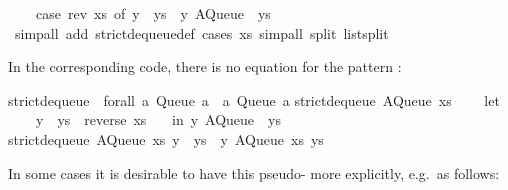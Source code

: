 \begin{isabellebody}
\ \ \ \ {\isacharparenleft}case\ rev\ xs\ of\ y\ {\isacharhash}\ ys\ {\isasymRightarrow}\ {\isacharparenleft}y{\isacharcomma}\ AQueue\ {\isacharbrackleft}{\isacharbrackright}\ ys{\isacharparenright}{\isacharparenright}{\isachardoublequoteclose}\isanewline
\ \ \isamarkupfalse%
\ {\isacharparenleft}simp{\isacharunderscore}all\ add{\isacharcolon}\ strict{\isacharunderscore}dequeue{\isacharunderscore}def{\isacharparenright}\ {\isacharparenleft}cases\ xs{\isacharcomma}\ simp{\isacharunderscore}all\ split{\isacharcolon}\ list{\isachardot}split{\isacharparenright}%
\endisatagquote
{\isafoldquote}%
%
\isadelimquote
%
\endisadelimquote
%
\begin{isamarkuptext}%
\noindent In the corresponding code, there is no equation
  for the pattern :%
\end{isamarkuptext}%
\isamarkuptrue%
%
\isadelimquote
%
\endisadelimquote
%
\isatagquote
%
\begin{isamarkuptext}%
\begin{typewriter}
    strict{\isacharunderscore}dequeue\ {\isacharcolon}{\isacharcolon}\ forall\ a{\isachardot}\ Queue\ a\ {\isacharminus}{\isachargreater}\ {\isacharparenleft}a{\isacharcomma}\ Queue\ a{\isacharparenright}{\isacharsemicolon}\isanewline
strict{\isacharunderscore}dequeue\ {\isacharparenleft}AQueue\ xs\ {\isacharbrackleft}{\isacharbrackright}{\isacharparenright}\ {\isacharequal}\isanewline
\ \ let\ {\isacharbraceleft}\isanewline
\ \ \ \ {\isacharparenleft}y\ {\isacharcolon}\ ys{\isacharparenright}\ {\isacharequal}\ reverse\ xs{\isacharsemicolon}\isanewline
\ \ {\isacharbraceright}\ in\ {\isacharparenleft}y{\isacharcomma}\ AQueue\ {\isacharbrackleft}{\isacharbrackright}\ ys{\isacharparenright}{\isacharsemicolon}\isanewline
strict{\isacharunderscore}dequeue\ {\isacharparenleft}AQueue\ xs\ {\isacharparenleft}y\ {\isacharcolon}\ ys{\isacharparenright}{\isacharparenright}\ {\isacharequal}\ {\isacharparenleft}y{\isacharcomma}\ AQueue\ xs\ ys{\isacharparenright}{\isacharsemicolon}
  \end{typewriter}%
\end{isamarkuptext}%
\isamarkuptrue%
%
\endisatagquote
{\isafoldquote}%
%
\isadelimquote
%
\endisadelimquote
%
\begin{isamarkuptext}%
\noindent In some cases it is desirable to have this
  pseudo- more explicitly, e.g.~as follows:%
\end{isamarkuptext}%
\isamarkuptrue%
%
\isadelimquote

\end{isabellebody}
